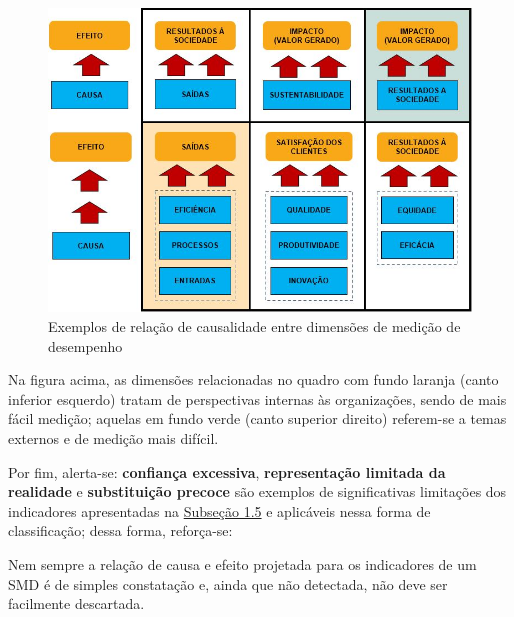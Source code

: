 \documentclass[
  letterpaper,
  DIV=11,
  numbers=noendperiod]{scrreprt}
\begin{document}
\begin{figure}

{\centering \includegraphics{images/relac_causa_efeito.JPG}

}

\caption{Exemplos de relação de causalidade entre dimensões de medição
de desempenho}

\end{figure}

Na figura acima, as dimensões relacionadas no quadro com fundo laranja
(canto inferior esquerdo) tratam de perspectivas internas às
organizações, sendo de mais fácil medição; aquelas em fundo verde (canto
superior direito) referem-se a temas externos e de medição mais difícil.

Por fim, alerta-se: \textbf{confiança excessiva}, \textbf{representação
limitada da realidade} e \textbf{substituição precoce} são exemplos de
significativas limitações dos indicadores apresentadas na
\href{/o/AZWDclIWFqqJuBEvyQWk/s/ws6bIBOPv2tLRHdwbB7y/1.-apresentacao/1.4-consequencias-indesejadas-e-limitacoes-da-medicao-de-desempenho\#fatores-limitantes-a-medicao-de-desempenho-no-setor-publico}{Subseção
1.5} e aplicáveis nessa forma de classificação; dessa forma, reforça-se:

\begin{tcolorbox}[enhanced jigsaw, title=\textcolor{quarto-callout-important-color}{\faExclamation}\hspace{0.5em}{Alerta}, bottomrule=.15mm, arc=.35mm, bottomtitle=1mm, toprule=.15mm, coltitle=black, opacityback=0, colback=white, rightrule=.15mm, breakable, toptitle=1mm, leftrule=.75mm, titlerule=0mm, opacitybacktitle=0.6, colbacktitle=quarto-callout-important-color!10!white, left=2mm, colframe=quarto-callout-important-color-frame]

Nem sempre a relação de causa e efeito projetada para os indicadores de
um SMD é de simples constatação e, ainda que não detectada, não deve ser
facilmente descartada.

\end{tcolorbox}
\end{document}
